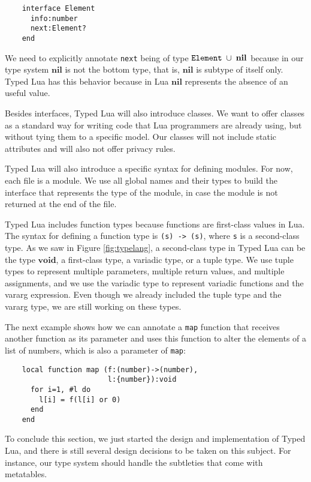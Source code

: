 \documentclass[preprint]{sig-alternate}
\newcommand{\Nil}{\mathbf{nil}}
\newcommand{\Void}{\mathbf{void}}
\begin{document}
\begin{verbatim}
    interface Element
      info:number
      next:Element?
    end
\end{verbatim}

We need to explicitly annotate \verb'next' being of type
${\tt Element}\;\cup\;\Nil$ because in our type system $\Nil$
is not the bottom type, that is, $\Nil$ is subtype of itself only.
Typed Lua has this behavior because in Lua $\Nil$ represents
the absence of an useful value.

Besides interfaces, Typed Lua will also introduce classes.
We want to offer classes as a standard way for writing code that
Lua programmers are already using, but without tying them to a
specific model.
Our classes will not include static attributes and will also not offer
privacy rules.

Typed Lua will also introduce a specific syntax for defining modules.
For now, each file is a module.
We use all global names and their types to build the interface that
represents the type of the module, in case the module is not returned
at the end of the file.

Typed Lua includes function types because functions are first-class
values in Lua.
The syntax for defining a function type is \verb'(s) -> (s)',
where \verb's' is a second-class type.
As we saw in Figure \ref{fig:typelang}, a second-class type in
Typed Lua can be the type $\Void$, a first-class type, a variadic
type, or a tuple type.
We use tuple types to represent multiple parameters, multiple return
values, and multiple assignments, and we use the variadic type to
represent variadic functions and the vararg expression.
Even though we already included the tuple type and the vararg type,
we are still working on these types.

The next example shows how we can annotate a \verb'map' function
that receives another function as its parameter and uses this
function to alter the elements of a list of numbers, which is
also a parameter of \verb'map':
\begin{verbatim}
    local function map (f:(number)->(number),
                        l:{number}):void
      for i=1, #l do
        l[i] = f(l[i] or 0)
      end
    end
\end{verbatim}

To conclude this section, we just started the design and
implementation of Typed Lua, and there is still several design
decisions to be taken on this subject.
For instance, our type system should handle the subtleties that
come with metatables.
\end{document}
